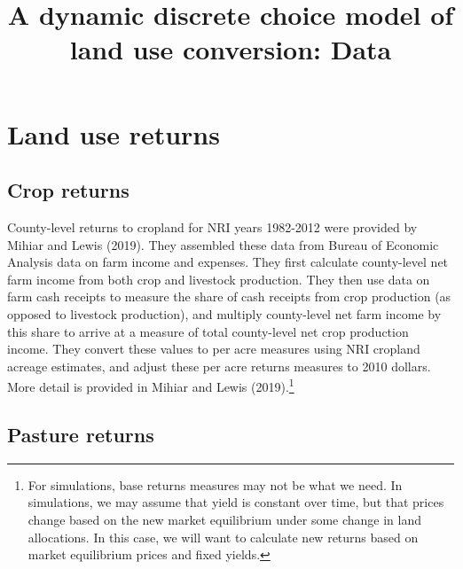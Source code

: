 \documentclass[11pt]{article}
\begin{document}
\title{{\bf A dynamic discrete choice model of land use conversion: Data}}


\maketitle

\section{Land use returns}

\subsection{Crop returns}

County-level returns to cropland for NRI years 1982-2012 were provided by Mihiar and Lewis (2019). They assembled these data from Bureau of Economic Analysis data on farm income and expenses. They first calculate county-level net farm income from both crop and livestock production. They then use data on farm cash receipts to measure the share of cash receipts from crop production (as opposed to livestock production), and multiply county-level net farm income by this share to arrive at a measure of total county-level net crop production income. They convert these values to per acre measures using NRI cropland acreage estimates, and adjust these per acre returns measures to 2010 dollars. More detail is provided in Mihiar and Lewis (2019).\footnote{For simulations, base returns measures may not be what we need. In simulations, we may assume that yield is constant over time, but that prices change based on the new market equilibrium under some change in land allocations. In this case, we will want to calculate new returns based on market equilibrium prices and fixed yields.}

\subsection{Pasture returns}
\end{document}

